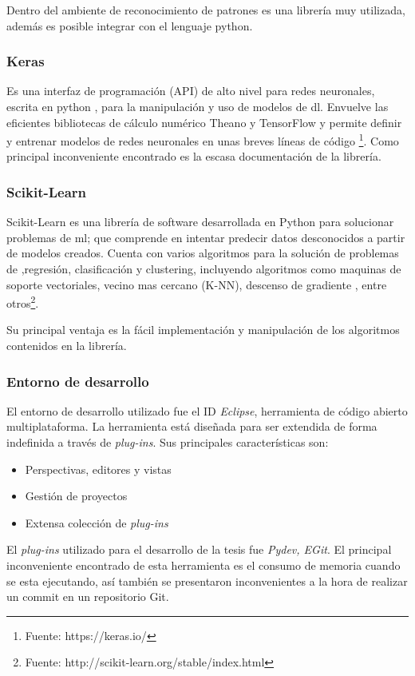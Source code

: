 Dentro del ambiente de reconocimiento de patrones es una librería muy utilizada, además es posible integrar con el lenguaje python.

\subsubsection*{Keras}

Es una interfaz de programación (API) de alto nivel para redes neuronales, escrita en python , para la manipulación y uso de modelos de \ac{dl}. 
Envuelve las eficientes bibliotecas de cálculo numérico Theano y TensorFlow y permite definir y entrenar modelos de redes neuronales en unas breves 
líneas de código \footnote{Fuente:  https://keras.io/}. Como principal inconveniente encontrado es la escasa documentación de la librería.

\subsubsection*{Scikit-Learn}\label{sub:sklearn}
Scikit-Learn es una librería de software desarrollada en Python para solucionar problemas de \ac{ml}; que comprende en intentar predecir datos 
desconocidos a partir de modelos creados. Cuenta con varios algoritmos para la solución de problemas de ,regresión, clasificación y clustering, 
incluyendo algoritmos como maquinas de soporte vectoriales, vecino mas cercano (K-NN), descenso de gradiente , entre otros\footnote{Fuente: 
http://scikit-learn.org/stable/index.html}.

Su principal ventaja es la fácil implementación y manipulación de los algoritmos contenidos en la librería.

\subsubsection*{Entorno de desarrollo}
El entorno de desarrollo utilizado fue el ID \textit{Eclipse}, herramienta de código abierto multiplataforma. La herramienta está diseñada para 
ser extendida de forma indefinida a través de \textit{plug-ins}. Sus principales características son:
\begin{itemize}
 \item Perspectivas, editores y vistas
 \item Gestión de proyectos
 \item Extensa colección de \textit{plug-ins}
\end{itemize}
El \textit{plug-ins} utilizado para el desarrollo de la tesis fue \textit{Pydev, EGit}. El principal inconveniente encontrado de esta herramienta es 
el consumo de memoria cuando se esta ejecutando, así también se presentaron inconvenientes a la hora de realizar un commit en un repositorio Git.

